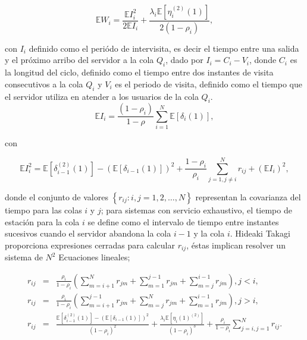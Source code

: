 \documentclass{article}
\newcommand{\esp}{\mathbb{E}}
\begin{document}
\begin{equation}\label{Eq.Tiempo.Espera}
\esp W_{i}=\frac{\esp I_{i}^{2}}{2\esp
I_{i}}+\frac{\lambda_{i}\esp\left[\eta_{i}^{(2)}\left(1\right)\right]}{2\left(1-\rho_{i}\right)},
\end{equation}

con $I_{i}$ definido como el peri\'odo de intervisita, es decir el tiempo entre una salida y el pr\'oximo arribo del servidor a la cola $Q_{i}$, dado por $I_{i}=C_{i}-V_{i}$, donde $C_{i}$ es la longitud del ciclo, definido como el tiempo entre dos instantes de
visita consecutivos a la cola $Q_{i}$ y $V_{i}$ es el periodo de visita, definido como el tiempo que el servidor utiliza en atender a los usuarios de la cola $Q_{i}$.
\begin{equation}\label{Eq.Periodo.Intervisita}
\esp
I_{i}=\frac{\left(1-\rho_{i}\right)}{1-\rho}\sum_{i=1}^{N}\esp\left[\delta_{i}\left(1\right)\right],
\end{equation}

con

\begin{equation}\label{Eq.Periodo.Intervisita}
\esp
I_{i}^{2}=\esp\left[\delta_{i-1}^{(2)}\left(1\right)\right]-\left(\esp\left[\delta_{i-1}\left(1\right)\right]\right)^{2}+
\frac{1-\rho_{i}}{\rho_{i}}\sum_{j=1,j\neq i}^{N}r_{ij}+\left(\esp
I_{i}\right)^{2},
\end{equation}

donde el conjunto de valores $\left\{r_{ij}:i,j=1,2,\ldots,N\right\}$ representan la covarianza del tiempo para las colas $i$ y $j$; para sistemas con servicio
exhaustivo, el tiempo de estaci\'on para la cola $i$ se define como el intervalo de tiempo entre instantes sucesivos cuando el servidor abandona la cola $i-1$ y la cola $i$. Hideaki Takagi \cite{Takagi} proporciona expresiones cerradas para calcular $r_{ij}$, \'estas implican resolver un sistema de $N^{2}$
Ecuaciones lineales;

\begin{eqnarray}\label{Eq.Cov.TT}
r_{ij}&=&\frac{\rho_{i}}{1-\rho_{i}}\left(\sum_{m=i+1}^{N}r_{jm}+\sum_{m=1}^{j-1}r_{jm}+\sum_{m=j}^{i-1}r_{jm}\right),\textrm{
}j<i,\\
r_{ij}&=&\frac{\rho_{i}}{1-\rho_{i}}\left(\sum_{m=i+1}^{j-1}r_{jm}+\sum_{m=j}^{N}r_{jm}+\sum_{m=1}^{i-1}r_{jm}\right),\textrm{
}j>i,\\
r_{ij}&=&\frac{\esp\left[\delta_{i-1}^{(2)}\left(1\right)\right]-\left(\esp\left[\delta_{i-1}\left(1\right)\right]\right)^{2}}
{\left(1-\rho_{i}\right)^{2}}+\frac{\lambda_{i}\esp\left[\eta_{i}\left(1\right)^{(2)}\right]}{\left(1-\rho_{i}\right)^{3}}+\frac{\rho_{i}}{1-\rho_{i}}\sum_{j=i,j=1}^{N}r_{ij}.
\end{eqnarray}%
\end{document}
